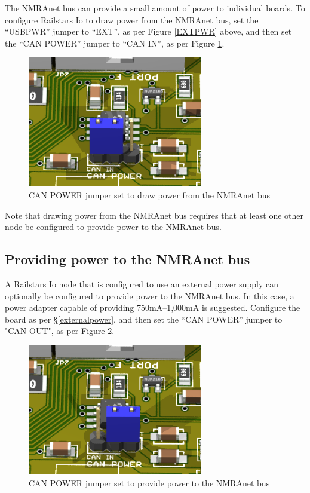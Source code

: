 \documentclass[12pt]{book}
\begin{document}
The NMRAnet bus can provide a small amount of power to individual boards. To configure Railstars Io to draw power from the NMRAnet bus, set the ``USBPWR'' jumper to ``EXT'', as per Figure \ref{EXTPWR} above, and then set the ``CAN POWER'' jumper to ``CAN IN'', as per Figure \ref{CANIN}.

\begin{figure}[htbp]
\begin{center}
\includegraphics[width=3in]{images/IoCANPowerIn.png}
\caption{CAN POWER jumper set to draw power from the NMRAnet bus}
\label{CANIN}
\end{center}
\end{figure}

Note that drawing power from the NMRAnet bus requires that at least one other node be configured to provide power to the NMRAnet bus.

\subsection{Providing power to the NMRAnet bus}

A Railstars Io node that is configured to use an external power supply can optionally be configured to provide power to the NMRAnet bus. In this case, a power adapter capable of providing 750mA--1,000mA is suggested. Configure the board as per \S\ref{externalpower}, and then set the ``CAN POWER'' jumper to "CAN OUT", as per Figure \ref{CANOUT}.

\begin{figure}[htbp]
\begin{center}
\includegraphics[width=3in]{images/IoCANPowerOut.png}
\caption{CAN POWER jumper set to provide power to the NMRAnet bus}
\label{CANOUT}
\end{center}
\end{figure}
\end{document}
